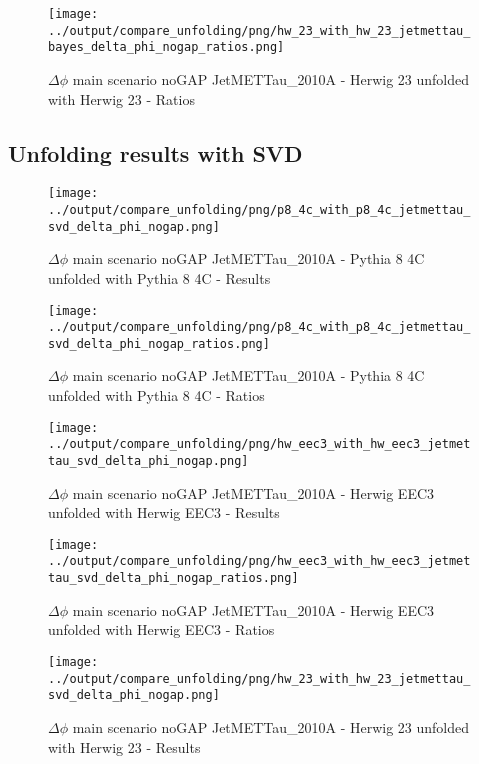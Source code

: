 \documentclass[11pt]{book}
\begin{document}
\begin{figure}[ht]
\centering
\texttt{[image: ../output/compare\_unfolding/png/hw\_23\_with\_hw\_23\_jetmettau\_bayes\_delta\_phi\_nogap\_ratios.png]}
\caption{$\Delta\phi$ main scenario noGAP JetMETTau\_2010A - Herwig 23 unfolded with Herwig 23 - Ratios}
\label{hw_23_hw_23_jetmettau_bayes_delta_phi_nogap_b}
\end{figure}


\clearpage
\subsection{Unfolding results with SVD}

\begin{figure}[ht]
\centering
\texttt{[image: ../output/compare\_unfolding/png/p8\_4c\_with\_p8\_4c\_jetmettau\_svd\_delta\_phi\_nogap.png]}
\caption{$\Delta\phi$ main scenario noGAP JetMETTau\_2010A - Pythia 8 4C unfolded with Pythia 8 4C - Results}
\label{p8_p8_jetmettau_svd_delta_phi_nogap_a}
\end{figure}

\begin{figure}[ht]
\centering
\texttt{[image: ../output/compare\_unfolding/png/p8\_4c\_with\_p8\_4c\_jetmettau\_svd\_delta\_phi\_nogap\_ratios.png]}
\caption{$\Delta\phi$ main scenario noGAP JetMETTau\_2010A - Pythia 8 4C unfolded with Pythia 8 4C - Ratios}
\label{p8_p8_jetmettau_svd_delta_phi_nogap_b}
\end{figure}

\begin{figure}[ht]
\centering
\texttt{[image: ../output/compare\_unfolding/png/hw\_eec3\_with\_hw\_eec3\_jetmettau\_svd\_delta\_phi\_nogap.png]}
\caption{$\Delta\phi$ main scenario noGAP JetMETTau\_2010A - Herwig EEC3 unfolded with Herwig EEC3 - Results}
\label{hw_eec3_hw_eec3_jetmettau_svd_delta_phi_nogap_a}
\end{figure}

\begin{figure}[ht]
\centering
\texttt{[image: ../output/compare\_unfolding/png/hw\_eec3\_with\_hw\_eec3\_jetmettau\_svd\_delta\_phi\_nogap\_ratios.png]}
\caption{$\Delta\phi$ main scenario noGAP JetMETTau\_2010A - Herwig EEC3 unfolded with Herwig EEC3 - Ratios}
\label{hw_eec3_hw_eec3_jetmettau_svd_delta_phi_nogap_b}
\end{figure}

\begin{figure}[ht]
\centering
\texttt{[image: ../output/compare\_unfolding/png/hw\_23\_with\_hw\_23\_jetmettau\_svd\_delta\_phi\_nogap.png]}
\caption{$\Delta\phi$ main scenario noGAP JetMETTau\_2010A - Herwig 23 unfolded with Herwig 23 - Results}
\label{hw_23_hw_23_jetmettau_svd_delta_phi_nogap_a}
\end{figure}
\end{document}
